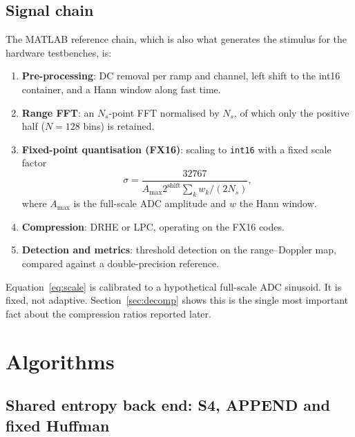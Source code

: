 \documentclass[10pt,twocolumn]{article}
\begin{document}
\subsection{Signal chain}

The MATLAB reference chain, which is also what generates the stimulus for the
hardware testbenches, is:
\begin{enumerate}\itemsep1pt
\item \textbf{Pre-processing}: DC removal per ramp and channel, left shift to
      the int16 container, and a Hann window along fast time.
\item \textbf{Range FFT}: an $N_s$-point FFT normalised by $N_s$, of which only
      the positive half ($N=128$ bins) is retained.
\item \textbf{Fixed-point quantisation (FX16)}: scaling to \texttt{int16} with
      a fixed scale factor
      \begin{equation}
      \label{eq:scale}
      \sigma = \frac{32767}{A_{\max} 2^{\mathrm{shift}} \sum_k w_k / (2N_s)},
      \end{equation}
      where $A_{\max}$ is the full-scale ADC amplitude and $w$ the Hann window.
\item \textbf{Compression}: DRHE or LPC, operating on the FX16 codes.
\item \textbf{Detection and metrics}: threshold detection on the
      range--Doppler map, compared against a double-precision reference.
\end{enumerate}

Equation~\eqref{eq:scale} is calibrated to a hypothetical full-scale ADC
sinusoid. It is fixed, not adaptive. Section~\ref{sec:decomp} shows this is the
single most important fact about the compression ratios reported later.

\section{Algorithms}
\label{sec:algorithms}

\subsection{Shared entropy back end: S4, APPEND and fixed Huffman}
\end{document}
